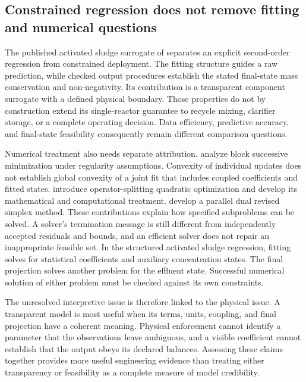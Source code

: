 \subsection{Constrained regression does not remove fitting and numerical questions}

The published activated sludge surrogate of \citet{Selerio2026} separates an explicit second-order regression from constrained deployment. The fitting structure guides a raw prediction, while checked output procedures establish the stated final-state mass conservation and non-negativity. Its contribution is a transparent component surrogate with a defined physical boundary. Those properties do not by construction extend its single-reactor guarantee to recycle mixing, clarifier storage, or a complete operating decision. Data efficiency, predictive accuracy, and final-state feasibility consequently remain different comparison questions.

Numerical treatment also needs separate attribution. \citet{Razaviyayn2013} analyze block successive minimization under regularity assumptions. Convexity of individual updates does not establish global convexity of a joint fit that includes coupled coefficients and fitted states. \citet{Stellato2018} introduce operator-splitting quadratic optimization and \citet{Stellato2020} develop its mathematical and computational treatment. \citet{HuangfuHall2018} develop a parallel dual revised simplex method. These contributions explain how specified subproblems can be solved. A solver's termination message is still different from independently accepted residuals and bounds, and an efficient solver does not repair an inappropriate feasible set. In the structured activated sludge regression, fitting solves for statistical coefficients and auxiliary concentration states. The final projection solves another problem for the effluent state. Successful numerical solution of either problem must be checked against its own constraints.

The unresolved interpretive issue is therefore linked to the physical issue. A transparent model is most useful when its terms, units, coupling, and final projection have a coherent meaning. Physical enforcement cannot identify a parameter that the observations leave ambiguous, and a visible coefficient cannot establish that the output obeys its declared balances. Assessing these claims together provides more useful engineering evidence than treating either transparency or feasibility as a complete measure of model credibility.

